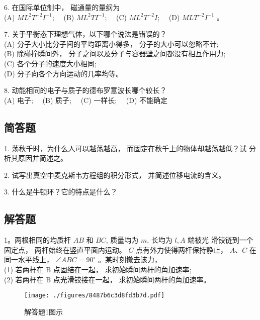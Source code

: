 6. 在国际单位制中， 磁通量的量纲为\\
(A) $M L^{2} T^{-2} I^{-1}$;$\quad$
(B) $M L^{2} T I^{-1}$;$\quad$
(C) $M L^{2} T^{-2} I$;$\quad$
(D) $M L T^{-2} I^{-1}$ 。

7. 关于平衡态下理想气体，以下哪个说法是错误的？\\
(A) 分子大小比分子间的平均距离小得多， 分子的大小可以忽略不计;\\
(B) 除碰撞瞬间外， 分子之间以及分子与容器壁之间都没有相互作用力;\\
(C) 各个分子的速度大小相同;\\
(D) 分子向各个方向运动的几率均等。

8. 动能相同的电子与质子的德布罗意波长哪个较长？\\
(A) 电子;$\quad$
(B) 质子;$\quad$
(C) 一样长;$\quad$
(D) 不能确定

\subsection{简答题}

1. 荡秋千时，为什么人可以越荡越高， 而固定在秋千上的物体却越荡越低？试 分析其原因并简述之。

2. 试写出真空中麦克斯韦方程组的积分形式， 并简述位移电流的含义。

3. 什么是牛顿环？它的特点是什么？
\subsection{解答题}
1。两根相同的均质杆 $A B$ 和 $B C$, 质量均为 $m$, 长均为 $l, A$ 端被光 滑铰链到一个固定点， 两杆始终在竖直平面内运动。 $C$ 点有外力使得两杆保持静止， $A $、$ C$ 在同一水平线上， $\angle A B C=90^{\circ}$ 。某时刻撤去该力，\\
(1) 若两杆在 $\mathrm{B}$ 点固结在一起， 求初始瞬间两杆的角加速率;\\
(2) 若两杆在 $\mathrm{B}$ 点光滑铰接在一起， 求初始瞬间两杆的角加速率。
\begin{figure}[ht]
\centering
\texttt{[image: ./figures/8487b6c3d8fd3b7d.pdf]}
\caption{解答题1图示} \label{fig_CAS12_2}
\end{figure}

